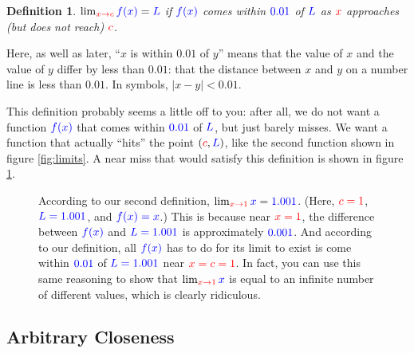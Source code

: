 \documentclass{myarticle}
\newcommand{\hor}[1]{\textcolor{red}{#1}}
\newcommand{\ver}[1]{\textcolor{blue}{#1}}
\theoremstyle{nospace}
\newtheorem*{oldattempt}{Definition}
\newenvironment{attempt}
{\begin{mdframed}\begin{oldattempt}}
    {\end{oldattempt}\end{mdframed}}
\newtheorem{old series theorem}{Theorem}
\newenvironment{series theorem}
{\begin{mdframed}\begin{old series theorem}}
    {\end{old series theorem}\end{mdframed}}
\begin{document}
\begin{attempt}
  $\lim_{\hor{x \to c}} \ver{f(x)} = \ver{L}$ if $\ver{f(x)}$ comes
  within $\ver{0.01}$ of $\ver{L}$ as $\hor{x}$ approaches (but does
  not reach) $\hor{c}$.
\end{attempt}

Here, as well as later, ``$x$ is within $0.01$ of $y$'' means that the
value of $x$ and the value of $y$ differ by less than $0.01$: that the
distance between $x$ and $y$ on a number line is less than $0.01$. In
symbols, $|x - y| < 0.01$.

This definition probably seems a little off to you: after all, we do
not want a function $\ver{f(x)}$ that comes within $\ver{0.01}$ of
$\ver{L}$, but just barely misses. We want a function that actually
``hits'' the point $(\hor{c}, \ver{L})$, like the second function
shown in figure \ref{fig:limits}. A near miss that would satisfy this
definition is shown in figure \ref{fig:near miss}.

\begin{figure} \centering
  \caption{According to our second definition,
    $\lim_{\hor{x \to 1}} \ver{x} = \ver{1.001}$. (Here,
    $\hor{c = 1}$, $\ver{L = 1.001}$, and $\ver{f(x) = x}$.) This is
    because near $\hor{x = 1}$, the difference between $\ver{f(x)}$
    and $\ver{L = 1.001}$ is approximately $\ver{0.001}$. And
    according to our definition, all $\ver{f(x)}$ has to do for its
    limit to exist is come within $\ver{0.01}$ of $\ver{L = 1.001}$
    near $\hor{x = c = 1}$. In fact, you can use this same reasoning
    to show that $\lim_{\hor{x \to 1}} \ver{x}$ is equal to an
    infinite number of different values, which is clearly ridiculous.}
  \label{fig:near miss}
\end{figure}

\subsection{Arbitrary Closeness}
\label{sec:arbitrary closeness}
\end{document}
